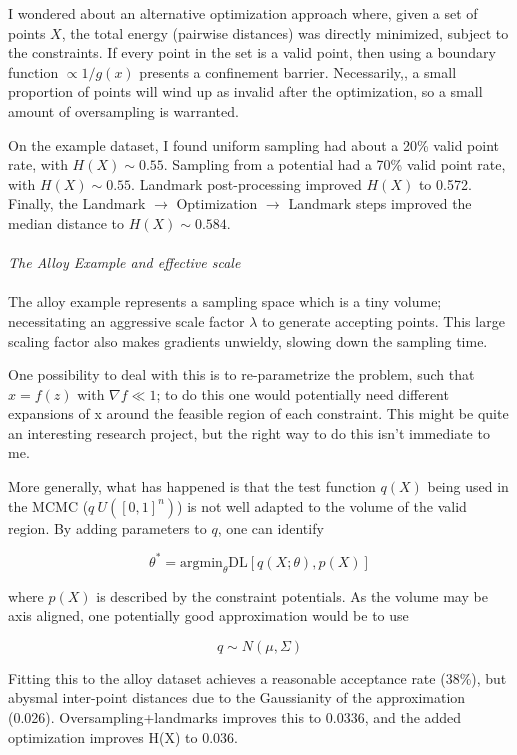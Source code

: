 \documentclass{article}
\begin{document}
I wondered about an alternative optimization approach where, given a set of points $X$, the total energy (pairwise distances) was directly minimized, subject to the constraints. If every point in the set is a valid point, then using a boundary function $\propto 1/g(x)$ presents a confinement barrier. Necessarily,, a small proportion of points will wind up as invalid after the optimization, so a small amount of oversampling is warranted.

On the example dataset, I found uniform sampling had about a 20\% valid point rate, with $H(X) \sim 0.55$. Sampling from a potential had a 70\% valid point rate, with $H(X) \sim 0.55$. Landmark post-processing improved $H(X)$ to 0.572. Finally, the Landmark $\rightarrow$ Optimization $\rightarrow$ Landmark steps improved the median distance to $H(X) \sim 0.584$. \\ \\
\textit{The Alloy Example and effective scale} \\ \\

The alloy example represents a sampling space which is a tiny volume; necessitating an aggressive scale factor $\lambda$ to generate accepting points. This large scaling factor also makes gradients unwieldy, slowing down the sampling time. 

One possibility to deal with this is to re-parametrize the problem, such that $x = f(z)$ with $\nabla f \ll 1$; to do this one would potentially need different expansions of x around the feasible region of each constraint. This might be quite an interesting research project, but the right way to do this isn't immediate to me.

More generally, what has happened is that the test function $q(X)$ being used in the MCMC ($q ~ U([0,1]^n)$) is not well adapted to the volume of the valid region. By adding parameters to $q$, one can identify

$$\theta^* = \mathrm{argmin}_\theta \mathrm{DL}[q(X;\theta), p(X)]$$

where $p(X)$ is described by the constraint potentials. As the volume may be axis aligned, one potentially good approximation would be to use

$$ q \sim N(\mu, \Sigma) $$

Fitting this to the alloy dataset achieves a reasonable acceptance rate (38\%), but abysmal inter-point distances due to the Gaussianity of the approximation (0.026). Oversampling+landmarks improves this to 0.0336, and the added optimization improves H(X) to 0.036. 
\end{document}
